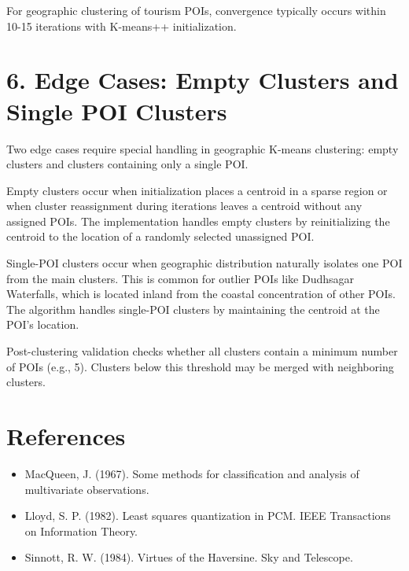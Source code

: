For geographic clustering of tourism POIs, convergence typically occurs within 10-15 iterations with K-means++ initialization.

\section{6. Edge Cases: Empty Clusters and Single POI Clusters}

Two edge cases require special handling in geographic K-means clustering: empty clusters and clusters containing only a single POI.

Empty clusters occur when initialization places a centroid in a sparse region or when cluster reassignment during iterations leaves a centroid without any assigned POIs. The implementation handles empty clusters by reinitializing the centroid to the location of a randomly selected unassigned POI.

Single-POI clusters occur when geographic distribution naturally isolates one POI from the main clusters. This is common for outlier POIs like Dudhsagar Waterfalls, which is located inland from the coastal concentration of other POIs. The algorithm handles single-POI clusters by maintaining the centroid at the POI's location.

Post-clustering validation checks whether all clusters contain a minimum number of POIs (e.g., 5). Clusters below this threshold may be merged with neighboring clusters.

\section*{References}

\begin{itemize}
\item MacQueen, J. (1967). Some methods for classification and analysis of multivariate observations.
\item Lloyd, S. P. (1982). Least squares quantization in PCM. IEEE Transactions on Information Theory.
\item Sinnott, R. W. (1984). Virtues of the Haversine. Sky and Telescope.
\end{itemize}
